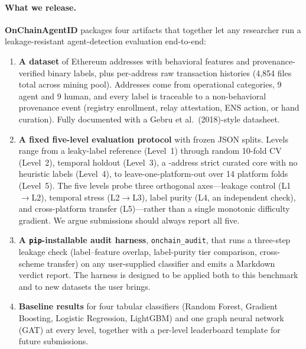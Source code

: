 \documentclass[10pt]{article}
\begin{document}
\paragraph{What we release.}
\textbf{OnChainAgentID} packages four artifacts that together let any researcher run a leakage-resistant agent-detection evaluation end-to-end:
\begin{enumerate}
    \item \textbf{A dataset} of \datasetNAddresses{} Ethereum addresses with \datasetNFeatures{} behavioral features and provenance-verified binary labels, plus per-address raw transaction histories (4{,}854 files total across mining pool). Addresses come from \datasetNCategories{} operational categories, 9 agent and 9 human, and every label is traceable to a non-behavioral provenance event (registry enrollment, relay attestation, ENS action, or hand curation). Fully documented with a Gebru et al.\ (2018)-style datasheet.
    \item \textbf{A fixed five-level evaluation protocol} with frozen JSON splits. Levels range from a leaky-label reference (Level~1) through random 10-fold CV (Level~2), temporal holdout (Level~3), a \datasetStrictCoreN{}-address strict curated core with no heuristic labels (Level~4), to leave-one-platform-out over 14 platform folds (Level~5). The five levels probe three orthogonal axes---leakage control (L1$\to$L2), temporal stress (L2$\to$L3), label purity (L4, an independent check), and cross-platform transfer (L5)---rather than a single monotonic difficulty gradient. We argue submissions should always report all five.
    \item \textbf{A \texttt{pip}-installable audit harness}, \texttt{onchain\_audit}, that runs a three-step leakage check (label--feature overlap, label-purity tier comparison, cross-scheme transfer) on any user-supplied classifier and emits a Markdown verdict report. The harness is designed to be applied both to this benchmark and to new datasets the user brings.
    \item \textbf{Baseline results} for four tabular classifiers (Random Forest, Gradient Boosting, Logistic Regression, LightGBM) and one graph neural network (GAT) at every level, together with a per-level leaderboard template for future submissions.
\end{enumerate}
\end{document}
